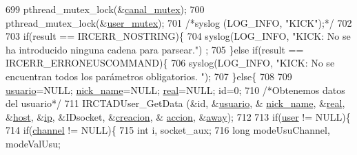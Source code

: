 \begin{DoxyCode}
{{{{{{{{{{699                         pthread\_mutex\_lock(&\hyperlink{_g-2361-06-_p1-_server_8c_ab86a544a49de18195048bac54dd3ac3e}{canal\_mutex});
700                         pthread\_mutex\_lock(&\hyperlink{_g-2361-06-_p1-_server_8c_a5dedd07a1144d2ab70b74a8e64b6a7c0}{user\_mutex});
701                         \textcolor{comment}{/*syslog (LOG\_INFO, "KICK");*/}
702 
703                         \textcolor{keywordflow}{if}(result == IRCERR\_NOSTRING)\{
704                                 syslog(LOG\_INFO, \textcolor{stringliteral}{"KICK: No se ha introducido ninguna cadena para parsear."})
      ;
705                         \}\textcolor{keywordflow}{else} \textcolor{keywordflow}{if}(result == IRCERR\_ERRONEUSCOMMAND)\{
706                                 syslog(LOG\_INFO, \textcolor{stringliteral}{"KICK: No se encuentran todos los parámetros obligatorios.
      "});
707                         \}\textcolor{keywordflow}{else}\{
708 
709                                 \hyperlink{_g-2361-06-_p1-_server_8c_a0147a5b81499984f9cb00379a8cb84af}{usuario}=NULL; \hyperlink{_g-2361-06-_p1-_server_8c_aabbf66718cda228b924a4a9441eadf62}{nick\_name}=NULL; 
      \hyperlink{_g-2361-06-_p1-_server_8c_af832f551e1c343666c3d2a55834139a0}{real}=NULL; \textcolor{keywordtype}{id}=0;
710                                 \textcolor{comment}{/*Obtenemos datos del usuario*/}
711                                 IRCTADUser\_GetData (&\textcolor{keywordtype}{id}, &\hyperlink{_g-2361-06-_p1-_server_8c_a0147a5b81499984f9cb00379a8cb84af}{usuario}, &
      \hyperlink{_g-2361-06-_p1-_server_8c_aabbf66718cda228b924a4a9441eadf62}{nick\_name}, &\hyperlink{_g-2361-06-_p1-_server_8c_af832f551e1c343666c3d2a55834139a0}{real}, &\hyperlink{_g-2361-06-_p1-_server_8c_a1c2046dcb30a629d6d9f45ff8f403f12}{host}, &\hyperlink{_g-2361-06-_p1-_server_8c_afbc356cd0e25d1dbbece7c10fd025fa6}{ip}, &IDsocket, &\hyperlink{_g-2361-06-_p1-_server_8c_a26292066ca0d17922eadee4161542ab9}{creacion}, &
      \hyperlink{_g-2361-06-_p1-_server_8c_a93e785c991445d8b8ee99c2e51242d5a}{accion}, &\hyperlink{_g-2361-06-_p1-_server_8c_adf86742e21384f58f8999d8317e6a370}{away});
712 
713                                 \textcolor{keywordflow}{if}(\hyperlink{_g-2361-06-_p1-_server_8c_a14871705f45ccdc5bb9f4549efd8e119}{user} != NULL)\{
714                                         \textcolor{keywordflow}{if}(\hyperlink{_g-2361-06-_p1-_server_8c_a842ca2f026578e5c479c095ff3335969}{channel} != NULL)\{
715                                                 \textcolor{keywordtype}{int} i, socket\_aux;
716                                                 \textcolor{keywordtype}{long} modeUsuChannel, modeValUsu;
}}}}}}}}}}
\end{DoxyCode}
